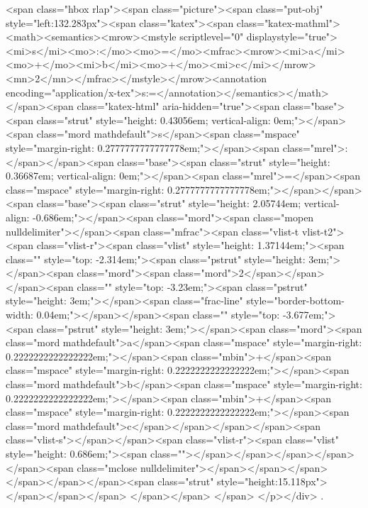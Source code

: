 <span class="hbox rlap"><span class="picture"><span class="put-obj" style="left:132.283px"><span class="katex"><span class="katex-mathml"><math><semantics><mrow><mstyle scriptlevel="0" displaystyle="true"><mi>s</mi><mo>:</mo><mo>=</mo><mfrac><mrow><mi>a</mi><mo>+</mo><mi>b</mi><mo>+</mo><mi>c</mi></mrow><mn>2</mn></mfrac></mstyle></mrow><annotation encoding="application/x-tex">\displaystyle s:=</annotation></semantics></math></span><span class="katex-html" aria-hidden="true"><span class="base"><span class="strut" style="height: 0.43056em; vertical-align: 0em;"></span><span class="mord mathdefault">s</span><span class="mspace" style="margin-right: 0.2777777777777778em;"></span><span class="mrel">:</span></span><span class="base"><span class="strut" style="height: 0.36687em; vertical-align: 0em;"></span><span class="mrel">=</span><span class="mspace" style="margin-right: 0.2777777777777778em;"></span></span><span class="base"><span class="strut" style="height: 2.05744em; vertical-align: -0.686em;"></span><span class="mord"><span class="mopen nulldelimiter"></span><span class="mfrac"><span class="vlist-t vlist-t2"><span class="vlist-r"><span class="vlist" style="height: 1.37144em;"><span class="" style="top: -2.314em;"><span class="pstrut" style="height: 3em;"></span><span class="mord"><span class="mord">2</span></span></span><span class="" style="top: -3.23em;"><span class="pstrut" style="height: 3em;"></span><span class="frac-line" style="border-bottom-width: 0.04em;"></span></span><span class="" style="top: -3.677em;"><span class="pstrut" style="height: 3em;"></span><span class="mord"><span class="mord mathdefault">a</span><span class="mspace" style="margin-right: 0.2222222222222222em;"></span><span class="mbin">+</span><span class="mspace" style="margin-right: 0.2222222222222222em;"></span><span class="mord mathdefault">b</span><span class="mspace" style="margin-right: 0.2222222222222222em;"></span><span class="mbin">+</span><span class="mspace" style="margin-right: 0.2222222222222222em;"></span><span class="mord mathdefault">c</span></span></span></span><span class="vlist-s">​</span></span><span class="vlist-r"><span class="vlist" style="height: 0.686em;"><span class=""></span></span></span></span></span><span class="mclose nulldelimiter"></span></span></span></span></span></span><span class="strut" style="height:15.118px"></span></span></span>
</span></span>​ </span>
</p></div>
.
